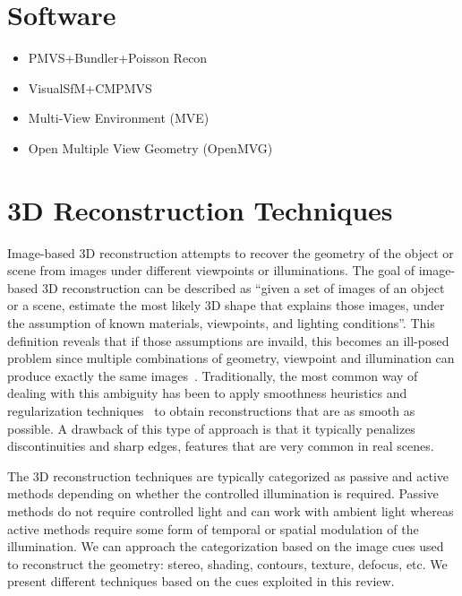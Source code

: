 \section{Software}
\begin{itemize}
\item PMVS+Bundler+Poisson Recon
\item VisualSfM+CMPMVS
\item Multi-View Environment (MVE)
\item Open Multiple View Geometry (OpenMVG)
\end{itemize}
\section{3D Reconstruction Techniques}
\label{sec:3DReconTech}

Image-based 3D reconstruction attempts to recover the geometry of the object or scene from images under different viewpoints or illuminations. The goal of image-based 3D reconstruction can be described as ``given a set of images of an object or a scene, estimate the most likely 3D shape that explains those images, under the assumption of known materials, viewpoints, and lighting conditions''. This definition reveals that if those assumptions are invaild, this becomes an ill-posed problem since multiple combinations of geometry, viewpoint and illumination can produce exactly the same images~\cite{poggio1985computational}. Traditionally, the most common way of dealing with this ambiguity has been to apply smoothness heuristics and regularization techniques~\cite{poggio1985computational} to obtain reconstructions that are as smooth as possible. A drawback of this type of approach is that it typically penalizes discontinuities and sharp edges, features that are very common in real scenes.

The 3D reconstruction techniques are typically categorized as passive and active methods depending on whether the controlled illumination is required. Passive methods do not require controlled light and can work with ambient light whereas active methods require some form of temporal or spatial modulation of the illumination. We can approach the categorization based on the image cues used to reconstruct the geometry: stereo, shading, contours, texture, defocus, etc. We present different techniques based on the cues exploited in this review.

